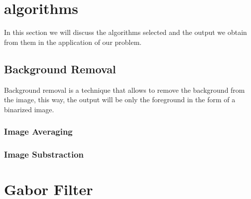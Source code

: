 \documentclass[11pt]{article}
\begin{document}


\section{algorithms}
In this section we will discuss the algorithms selected and the output we obtain from them in the application of our problem.

\subsection{Background Removal} 
Background removal is a technique that allows to remove the background from the image, this way, the output will be only the foreground in the form of a binarized image.




\subsubsection{Image Averaging}



\subsubsection{Image Substraction}



\section{Gabor Filter}
\end{document}

